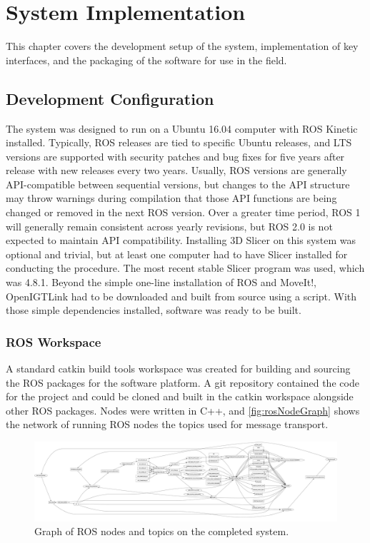\documentclass[12pt]{report}
\makeatletter
\renewcommand{\todo}[2][]{%
    \@todo[caption={#2}, #1]{\begin{spacing}{0.5}#2\end{spacing}}%
}
\makeatother
\begin{document}
\chapter{System Implementation}
This chapter covers the development setup of the system, implementation of key interfaces, and the packaging of the software for use in the field.


\section{Development Configuration}
\label{developmentConfiguration}
The system was designed to run on a Ubuntu 16.04 computer with ROS Kinetic installed. Typically, ROS releases are tied to specific Ubuntu releases, and LTS versions are supported with security patches and bug fixes for five years after release with new releases every two years. Usually, ROS versions are generally API-compatible between sequential versions, but changes to the API structure may throw warnings during compilation that those API functions are being changed or removed in the next ROS version. Over a greater time period, ROS 1 will generally remain consistent across yearly revisions, but ROS 2.0 is not expected to maintain API compatibility. Installing 3D Slicer on this system was optional and trivial, but at least one computer had to have Slicer installed for conducting the procedure. The most recent stable Slicer program  was used, which was 4.8.1. Beyond the simple one-line installation of ROS and MoveIt!, OpenIGTLink had to be downloaded and built from source using a script. With those simple dependencies installed, software was ready to be built.

\subsection{ROS Workspace}
A standard catkin build tools workspace was created for building and sourcing the ROS packages for the software platform. A git repository contained the code for the project and could be cloned and built in the catkin workspace alongside other ROS packages. Nodes were written in C++, and \autoref{fig:rosNodeGraph} shows the network of running ROS nodes the topics used for message transport.

\begin{figure}[thpb]
	\centering
	\includegraphics[width=\textwidth]{diagrams/rosgraph_workspace_clipped.pdf}
    \todo[inline]{Needs to be readable when printed}
    \caption{Graph of ROS nodes and topics on the completed system. }
    \label{fig:rosNodeGraph}
\end{figure}
\end{document}
